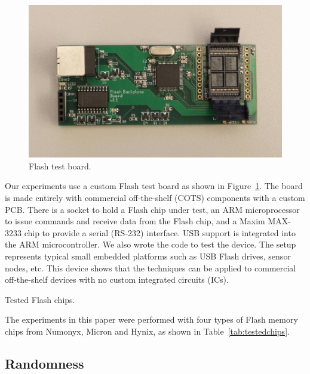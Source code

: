 \begin{figure}
\begin{center} 
\includegraphics[width=\mywidth]{figs/flashtestboard.pdf} 
\caption{Flash test board.}
\label{fig:flashtestboard} 
\vspace{-0.1in}
\end{center} 
\end{figure} 

Our experiments use a custom Flash test board as shown in 
Figure~\ref{fig:flashtestboard}. The board is made entirely with 
commercial off-the-shelf (COTS) components with a custom PCB. 
There is a socket to hold a Flash chip under test, an ARM 
microprocessor to issue commands and receive data from the Flash 
chip, and a Maxim MAX-3233 chip to provide a serial (RS-232) 
interface. USB support is integrated into the ARM microcontroller. 
We also wrote the code to test the device. The setup represents 
typical small embedded platforms such as USB Flash drives, sensor 
nodes, etc. This device shows that the techniques can be applied 
to commercial off-the-shelf devices with no custom integrated 
circuits (ICs).

\begin{table}
  \begin{center}
    
  \end{center}
\caption{Tested Flash chips.}
\vspace{-0.2in}
\label{tab:testedchips}
\end{table}

The experiments in this paper were performed with four types of Flash memory chips from Numonyx, Micron and Hynix, as shown in Table~\ref{tab:testedchips}.

\subsection{ Randomness}

